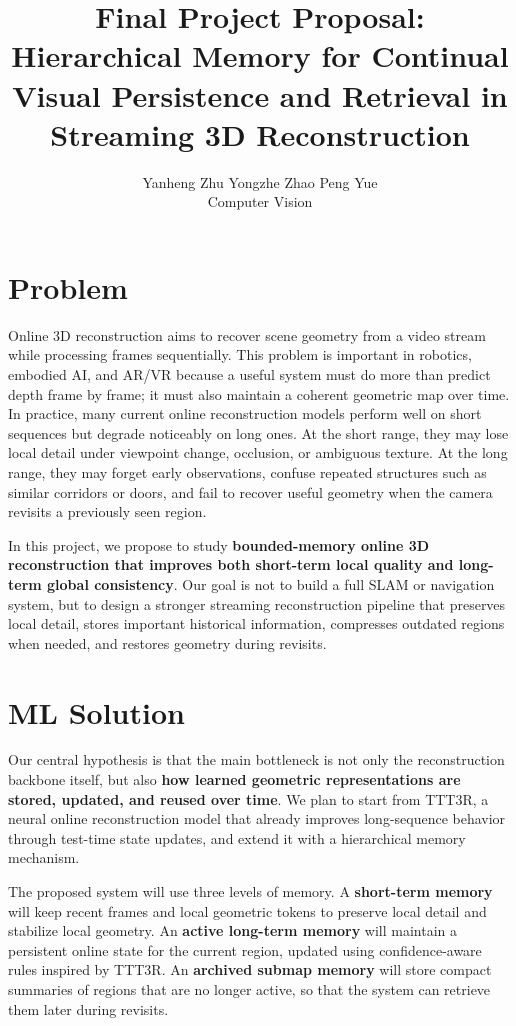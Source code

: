 \documentclass[10pt]{article}
\title{Final Project Proposal:\\Hierarchical Memory for Continual Visual Persistence and Retrieval in Streaming 3D Reconstruction}
\author{\large Yanheng Zhu \quad Yongzhe Zhao \quad Peng Yue\\[0.35em]\normalsize Computer Vision}
\date{}
\begin{document}
\maketitle
\vspace{-1.3em}

\section*{Problem}
Online 3D reconstruction aims to recover scene geometry from a video stream while processing frames sequentially. This problem is important in robotics, embodied AI, and AR/VR because a useful system must do more than predict depth frame by frame; it must also maintain a coherent geometric map over time. In practice, many current online reconstruction models perform well on short sequences but degrade noticeably on long ones. At the short range, they may lose local detail under viewpoint change, occlusion, or ambiguous texture. At the long range, they may forget early observations, confuse repeated structures such as similar corridors or doors, and fail to recover useful geometry when the camera revisits a previously seen region.

In this project, we propose to study \textbf{bounded-memory online 3D reconstruction that improves both short-term local quality and long-term global consistency}. Our goal is not to build a full SLAM or navigation system, but to design a stronger streaming reconstruction pipeline that preserves local detail, stores important historical information, compresses outdated regions when needed, and restores geometry during revisits.

\section*{ML Solution}
Our central hypothesis is that the main bottleneck is not only the reconstruction backbone itself, but also \textbf{how learned geometric representations are stored, updated, and reused over time}. We plan to start from TTT3R, a neural online reconstruction model that already improves long-sequence behavior through test-time state updates, and extend it with a hierarchical memory mechanism.

The proposed system will use three levels of memory. A \textbf{short-term memory} will keep recent frames and local geometric tokens to preserve local detail and stabilize local geometry. An \textbf{active long-term memory} will maintain a persistent online state for the current region, updated using confidence-aware rules inspired by TTT3R. An \textbf{archived submap memory} will store compact summaries of regions that are no longer active, so that the system can retrieve them later during revisits.
\end{document}
